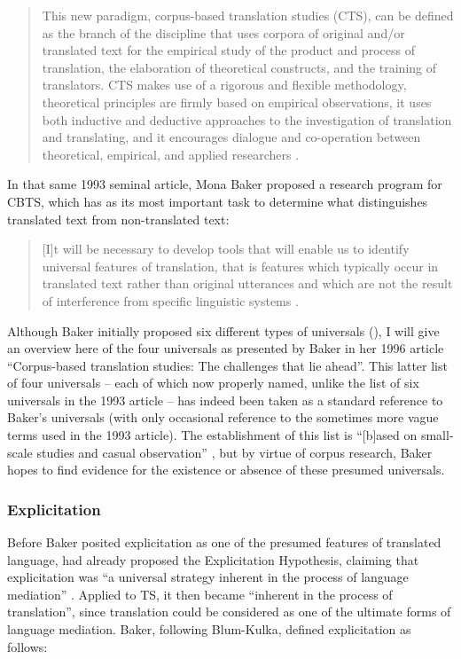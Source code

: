 \begin{quote}
This new paradigm, corpus-based translation studies (CTS), can be defined as the branch of the discipline that uses corpora of original and/or translated text for the empirical study of the product and process of translation, the elaboration of theoretical constructs, and the training of translators. CTS makes use of a rigorous and flexible methodology, theoretical principles are firmly based on empirical observations, it uses both inductive and deductive approaches to the investigation of translation and translating, and it encourages dialogue and co-operation between theoretical, empirical, and applied researchers \citep[45]{granger_corpora_2003}.
\end{quote}

In that same 1993 seminal article, Mona Baker proposed a research program for CBTS, which has as its most important task to determine what distinguishes translated text from non-translated text:

\begin{quote}
[I]t will be necessary to develop tools that will enable us to identify universal features of translation, that is features which typically occur in translated text rather than original utterances and which are not the result of interference from specific linguistic systems \citep[243]{baker_corpus_1993}.
\end{quote}

Although Baker initially proposed six different types of universals (\citeyear[243-245]{baker_corpus_1993}), I will give an overview here of the four universals as presented by Baker in her 1996 article “Corpus-based translation studies: The challenges that lie ahead”. This latter list of four universals – each of which now properly named, unlike the list of six universals in the 1993 article – has indeed been taken as a standard reference to Baker’s universals (with only occasional reference to the sometimes more vague terms used in the 1993 article). The establishment of this list is “[b]ased on small-scale studies and casual observation” \citep[243]{baker_corpus_1993}, but by virtue of corpus research, Baker hopes to find evidence for the existence or absence of these presumed universals.

\subsubsection{Explicitation}
\label{sec:2.2.2.1}  
Before Baker posited explicitation as one of the presumed features of translated language, \citet{house_shifts_1986} had already proposed the Explicitation Hypothesis, claiming that explicitation was “a universal strategy inherent in the process of language mediation” \citep[21]{house_shifts_1986}. Applied to TS, it then became “inherent in the process of translation”, since translation could be considered as one of the ultimate forms of language mediation. Baker, following Blum-Kulka, defined explicitation as follows:

